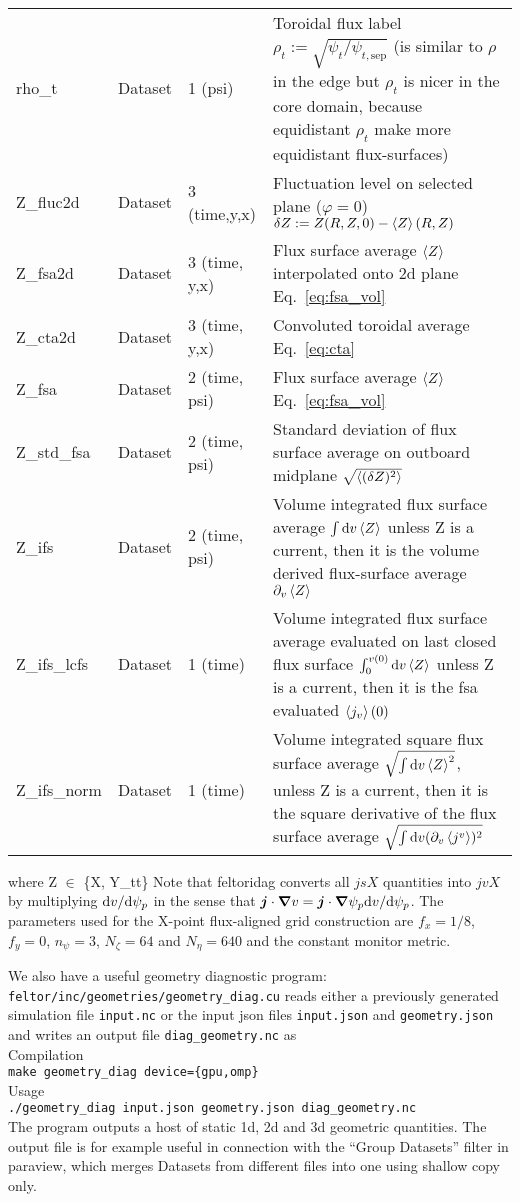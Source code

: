 \begin{longtable}{lll>{\RaggedRight}p{7cm}}
rho\_t           & Dataset & 1 (psi) & Toroidal flux label $\rho_t := \sqrt{\psi_t/\psi_{t,\mathrm{sep}}}$ (is similar to $\rho$ in the edge but $\rho_t$ is nicer in the core domain, because equidistant $\rho_t$ make more equidistant flux-surfaces)\\
Z\_fluc2d        & Dataset & 3 (time,y,x) & Fluctuation level on selected plane ($\varphi= 0$) $\delta Z := Z(R,Z,0) - \left \langle  Z \right \rangle(R,Z)$ \\
Z\_fsa2d         & Dataset & 3 (time, y,x) & Flux surface average $\left \langle  Z \right \rangle$ interpolated onto 2d plane Eq.~\eqref{eq:fsa_vol} \\
Z\_cta2d         & Dataset & 3 (time, y,x) & Convoluted toroidal average Eq.~\eqref{eq:cta} \\
Z\_fsa           & Dataset & 2 (time, psi) & Flux surface average $\left \langle  Z \right \rangle$ Eq.~\eqref{eq:fsa_vol} \\
Z\_std\_fsa      & Dataset & 2 (time, psi) & Standard deviation of flux surface average on outboard midplane $\sqrt{\left \langle (\delta Z)^2 \right \rangle}$ \\
Z\_ifs           & Dataset & 2 (time, psi) & Volume integrated flux surface average $\int\mathrm{d} v\left \langle  Z \right \rangle$ unless Z is a current, then it is the volume derived flux-surface average $\partial_v \left \langle  Z \right \rangle$ \\
Z\_ifs\_lcfs     & Dataset & 1 (time) & Volume integrated flux surface average evaluated on last closed flux surface $\int_0^{v(0)}\mathrm{d} v\left \langle  Z \right \rangle$ unless Z is a current, then it is the fsa evaluated $\left \langle  j_v \right \rangle(0)$ \\
Z\_ifs\_norm     & Dataset & 1 (time) & Volume integrated square flux surface average $\sqrt{\int \mathrm{d} v \left \langle Z \right \rangle^2}$, unless Z is a current, then it is the square derivative of the flux surface average $\sqrt{\int\mathrm{d} v (\partial_v \left \langle j^v \right \rangle)^2}$\\
\bottomrule
\end{longtable}
where Z $\in$ \{X, Y\_tt\}
Note that feltoridag converts all $jsX$ quantities into $jvX$
by multiplying $\mathrm{d} v/\mathrm{d} \psi_p$
in the sense that ${\boldsymbol{j}}\cdot{\boldsymbol{\nabla}} v  = {\boldsymbol{j}} \cdot{\boldsymbol{\nabla}} \psi_p \mathrm{d} v/\mathrm{d}\psi_p$.
The parameters used for the X-point flux-aligned grid construction are $f_x = 1/8$, $f_y = 0$, $n_\psi = 3$, $N_\zeta = 64$ and $N_\eta = 640$ and the constant monitor metric.

We also have a useful geometry diagnostic program:
\texttt{feltor/inc/geometries/geometry\_diag.cu} reads either a previously
generated simulation file \texttt{input.nc} or the input json files
\texttt{input.json} and \texttt{geometry.json} and writes an output file \texttt{diag\_geometry.nc} as\\
Compilation\\
\texttt{make geometry\_diag device=\{gpu,omp\}} \\
Usage \\
\texttt{./geometry\_diag input.json geometry.json diag\_geometry.nc} \\
The program outputs a host of static 1d, 2d and 3d geometric quantities.
The output file is for example useful in connection with the ``Group Datasets'' filter in paraview, which merges Datasets from different files into one using shallow copy only.
